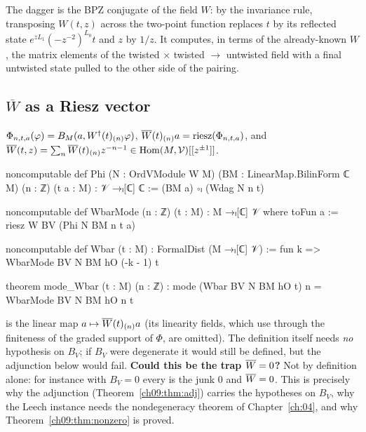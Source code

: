 \begin{physics}
The dagger is the BPZ conjugate of the field $W$: by the invariance rule, transposing $W(t,z)$ across the two-point function replaces $t$ by its reflected state $e^{zL_1}(-z^{-2})^{L_0}t$ and $z$ by $1/z$. It computes, in terms of the already-known $W$, the matrix elements of the twisted $\times$ twisted $\to$ untwisted field with a final untwisted state pulled to the other side of the pairing.
\end{physics}

\subsection{\texorpdfstring{$\overline{W}$}{Wbar} as a Riesz vector}

\begin{definition}[$\chnineWb$]\label{ch09:def:WbarMode}
$\Phi_{n,t,a}(\varphi)=B_M(a,W^{\dagger}(t)_{(n)}\varphi)$, $\overline{W}(t)_{(n)}a=\mathrm{riesz}(\Phi_{n,t,a})$,
and $\overline{W}(t,z)=\sum_n\overline{W}(t)_{(n)}z^{-n-1}\in\operatorname{Hom}(M,\mathcal{V})[[z^{\pm1}]]$.
\end{definition}
\begin{leancode}
noncomputable def Phi (N : OrdVModule W M) (BM : LinearMap.BilinForm ℂ M) (n : ℤ) (t a : M) :
    𝒱 →ₗ[ℂ] ℂ :=
  (BM a) ∘ₗ (Wdag N n t)

noncomputable def WbarMode (n : ℤ) (t : M) : M →ₗ[ℂ] 𝒱 where
  toFun a := riesz W BV (Phi N BM n t a)

noncomputable def Wbar (t : M) : FormalDist (M →ₗ[ℂ] 𝒱) :=
  fun k => WbarMode BV N BM hO (-k - 1) t

theorem mode_Wbar (t : M) (n : ℤ) : mode (Wbar BV N BM hO t) n = WbarMode BV N BM hO n t
\end{leancode}
\begin{dictionary}
 is the linear map $a\mapsto\overline{W}(t)_{(n)}a$ (its linearity
fields, which use  through the finiteness of the graded support of $\Phi$, are omitted).
The definition itself needs \emph{no} hypothesis on $B_V$; if $B_V$ were degenerate it would still
be defined, but the adjunction below would fail. \textbf{Could this be the trap $\overline{W}=0$?} Not
by definition alone: for instance with $B_V=0$ every  is the junk $0$ and
$\overline{W}=0$. This is precisely why the adjunction (Theorem~\ref{ch09:thm:adj}) carries the
hypotheses on $B_V$, why the Leech instance needs the nondegeneracy theorem of Chapter~\ref{ch:04},
and why Theorem~\ref{ch09:thm:nonzero} is proved.
\end{dictionary}

